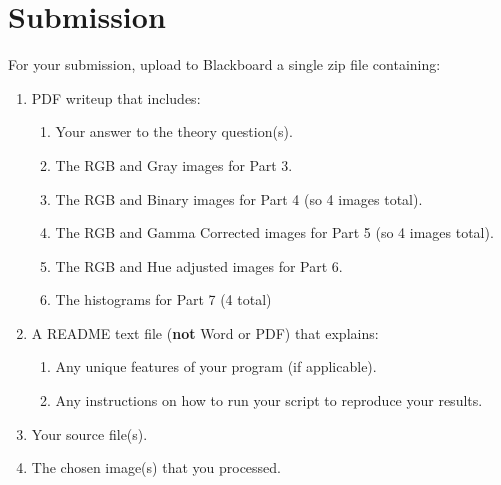 \documentclass[12pt]{article}
\begin{document}
\newpage
\section*{Submission}
For your submission, upload to Blackboard a single zip file containing:

\begin{enumerate}
\item PDF writeup that includes:
\begin{enumerate}
\item Your answer to the theory question(s).
\item The RGB and Gray images for Part 3.
\item The RGB and Binary images for Part 4 (so 4 images total).
\item The RGB and Gamma Corrected images for Part 5 (so 4 images total).
\item The RGB and Hue adjusted images for Part 6.
\item The histograms for Part 7 (4 total)
\end{enumerate}
\item A README text file (\textbf{not} Word or PDF) that explains:
\begin{enumerate}
\item Any unique features of your program (if applicable).
\item Any instructions on how to run your script to reproduce your results.
\end{enumerate}
\item Your source file(s).
\item The chosen image(s) that you processed.
\end{enumerate}
\end{document}
